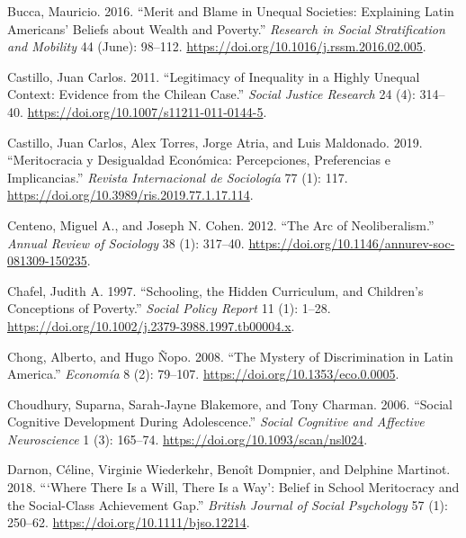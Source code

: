 \documentclass[
  letterpaper,
  DIV=11,
  numbers=noendperiod]{scrartcl}
\newlength{\cslhangindent}
\newlength{\cslentryspacingunit} %
\newenvironment{CSLReferences}[2] %
 {%
  \setlength{\parindent}{0pt}
  \ifodd #1
  \let\oldpar\par
  \def\par{\hangindent=\cslhangindent\oldpar}
  \fi
  \setlength{\parskip}{#2\cslentryspacingunit}
 }%
 {}
\begin{document}
\begin{CSLReferences}{1}{0}
\leavevmode{}%
Bucca, Mauricio. 2016. {``Merit and Blame in Unequal Societies:
{Explaining Latin Americans}' Beliefs about Wealth and Poverty.''}
\emph{Research in Social Stratification and Mobility} 44 (June):
98--112. \url{https://doi.org/10.1016/j.rssm.2016.02.005}.

\leavevmode{}%
Castillo, Juan Carlos. 2011. {``Legitimacy of {Inequality} in a {Highly
Unequal Context}: {Evidence} from the {Chilean Case}.''} \emph{Social
Justice Research} 24 (4): 314--40.
\url{https://doi.org/10.1007/s11211-011-0144-5}.

\leavevmode{}%
Castillo, Juan Carlos, Alex Torres, Jorge Atria, and Luis Maldonado.
2019. {``Meritocracia y Desigualdad Econ{ó}mica: {Percepciones},
Preferencias e Implicancias.''} \emph{Revista Internacional de
Sociolog{í}a} 77 (1): 117.
\url{https://doi.org/10.3989/ris.2019.77.1.17.114}.

\leavevmode{}%
Centeno, Miguel A., and Joseph N. Cohen. 2012. {``The {Arc} of
{Neoliberalism}.''} \emph{Annual Review of Sociology} 38 (1): 317--40.
\url{https://doi.org/10.1146/annurev-soc-081309-150235}.

\leavevmode{}%
Chafel, Judith A. 1997. {``Schooling, the {Hidden Curriculum}, and
{Children}'s {Conceptions} of {Poverty}.''} \emph{Social Policy Report}
11 (1): 1--28. \url{https://doi.org/10.1002/j.2379-3988.1997.tb00004.x}.

\leavevmode{}%
Chong, Alberto, and Hugo Ñopo. 2008. {``The {Mystery} of
{Discrimination} in {Latin America}.''} \emph{Econom{í}a} 8 (2):
79--107. \url{https://doi.org/10.1353/eco.0.0005}.

\leavevmode{}%
Choudhury, Suparna, Sarah-Jayne Blakemore, and Tony Charman. 2006.
{``Social Cognitive Development During Adolescence.''} \emph{Social
Cognitive and Affective Neuroscience} 1 (3): 165--74.
\url{https://doi.org/10.1093/scan/nsl024}.

\leavevmode{}%
Darnon, Céline, Virginie Wiederkehr, Benoît Dompnier, and Delphine
Martinot. 2018. {``{`{Where} There Is a Will, There Is a Way'}: {Belief}
in School Meritocracy and the Social-Class Achievement Gap.''}
\emph{British Journal of Social Psychology} 57 (1): 250--62.
\url{https://doi.org/10.1111/bjso.12214}.


\end{CSLReferences}
\end{document}
